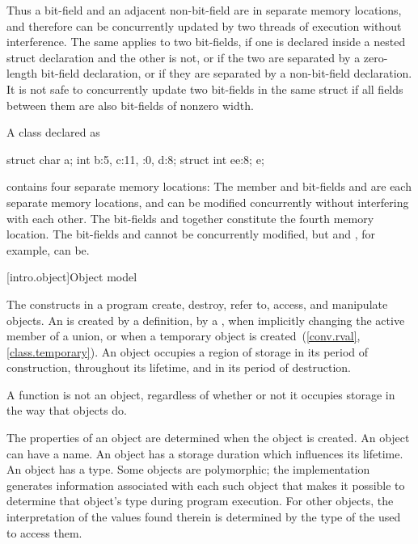 \pnum
\begin{note}
Thus a bit-field and an adjacent non-bit-field are in separate memory
locations, and therefore can be concurrently updated by two threads of execution
without interference. The same applies to two bit-fields, if one is declared
inside a nested struct declaration and the other is not, or if the two are
separated by a zero-length bit-field declaration, or if they are separated by a
non-bit-field declaration. It is not safe to concurrently update two bit-fields
in the same struct if all fields between them are also bit-fields of nonzero
width.
\end{note}

\pnum
\begin{example}
A class declared as
\begin{codeblock}
struct {
  char a;
  int b:5,
  c:11,
  :0,
  d:8;
  struct {int ee:8;} e;
}
\end{codeblock}
contains four separate memory locations: The member  and bit-fields
 and  are each separate memory locations, and can be
modified concurrently without interfering with each other. The bit-fields
 and  together constitute the fourth memory location. The
bit-fields  and  cannot be concurrently modified, but
 and , for example, can be.
\end{example}

[intro.object]{Object model}

\pnum
{}%
The constructs in a \Cpp{} program create, destroy, refer to, access, and
manipulate objects.
An  is created
by a definition,
by a ,
when implicitly changing the active member of a union,
or
when a temporary object is created~(\ref{conv.rval}, \ref{class.temporary}).
An object occupies a region of storage
in its period of construction,
throughout its lifetime,
and
in its period of destruction.
\begin{note}
A function is not an object, regardless of whether or not it
occupies storage in the way that objects do.
\end{note}
The properties of an
object are determined when the object is created. An object can have a
name. An object has a storage
duration which influences its
lifetime. An object has a
type.
Some objects are
polymorphic; the implementation
generates information associated with each such object that makes it
possible to determine that object's type during program execution. For
other objects, the interpretation of the values found therein is
determined by the type of the 
used to access them.

